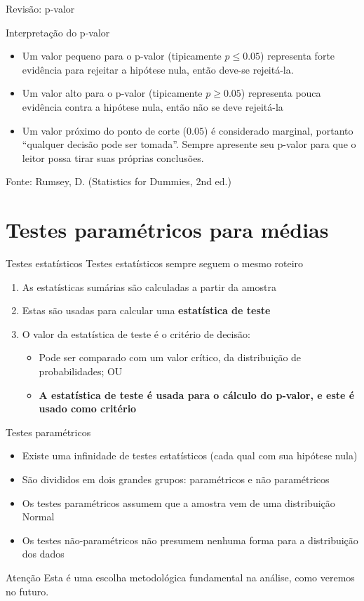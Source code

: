 \documentclass{beamer}
\begin{document}
\begin{frame}{Revisão: p-valor}
\begin{block}{Interpretação do p-valor}
  \begin{itemize}
  \item Um valor pequeno para o p-valor (tipicamente $p \le 0.05$)
    representa forte evidência para rejeitar a hipótese nula, então
    deve-se rejeitá-la.
  \item Um valor alto para o p-valor (tipicamente $p \ge 0.05$)
    representa pouca evidência contra a hipótese nula, então não se
    deve rejeitá-la
  \item Um valor próximo do ponto de corte ($0.05$) é considerado
    marginal, portanto ``qualquer decisão pode ser tomada''. Sempre
    apresente seu p-valor para que o leitor possa tirar suas próprias
    conclusões.
  \end{itemize}
\end{block}
Fonte: Rumsey, D. (Statistics for Dummies, 2nd ed.)
\end{frame}

\section{Testes paramétricos para médias}

\begin{frame}{Testes estatísticos}
Testes estatísticos sempre seguem o mesmo roteiro
  \begin{enumerate}
  \item As estatísticas sumárias são calculadas a partir da amostra
  \item Estas são usadas para calcular uma {\bf estatística de teste}
  \item O valor da estatística de teste é o critério de decisão:
    \begin{itemize}
    \item Pode ser comparado com um valor crítico, da distribuição de probabilidades; OU
    \item {\bf A estatística de teste é usada para o cálculo do p-valor, e este é usado como critério}
    \end{itemize}
  \end{enumerate}
\end{frame}

\begin{frame}{Testes paramétricos}
  \begin{itemize}
  \item Existe uma infinidade de testes estatísticos (cada qual com sua hipótese nula)
  \item São divididos em dois grandes grupos: paramétricos e não paramétricos
  \item Os testes paramétricos assumem que a amostra vem de uma \alert{distribuição Normal}
  \item Os testes não-paramétricos não presumem nenhuma forma para a distribuição dos dados
  \end{itemize}
  \begin{block}{Atenção}
    Esta é uma escolha metodológica fundamental na análise, como veremos no futuro.
  \end{block}
\end{frame}
\end{document}
